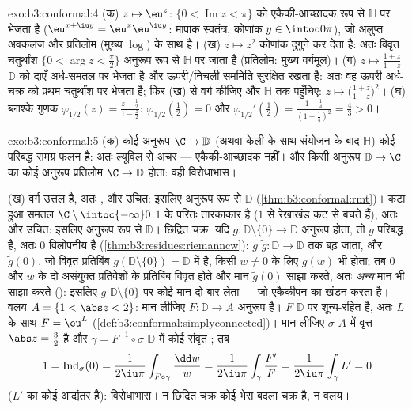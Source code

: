 \begin{solution}{exo:b3:conformal:4}
(क) $z \mapsto \eu^z$: $\{0 < \operatorname{Im}z <
\pi\}$ को एकैकी-आच्छादक रूप से $\mathbb H$ पर भेजता है ($\eu^{x+\iu y} =
\eu^x\eu^{\iu y}$: मापांक
स्वतंत्र, कोणांक $y \in
\intoo0\pi$), जो अलुप्त अवकलज और  प्रतिलोम
(मुख्य $\log$) के साथ  है।
(ख) $z \mapsto z^2$ कोणांक दुगुने कर देता है: अतः विवृत चतुर्थांश $\{0 < \arg z < \frac\pi2\}$ अनुरूप
रूप से $\mathbb
H$ पर जाता है (प्रतिलोम: मुख्य वर्गमूल)।
(ग) $z \mapsto \frac{1 + z}{1 - z}$ $\mathbb D$ को दाएँ अर्ध-समतल पर भेजता है और ऊपरी/निचली सममिति
सुरक्षित रखता है: अतः वह ऊपरी अर्ध-चक्र को प्रथम चतुर्थांश पर भेजता
है; फिर (ख) से वर्ग कीजिए और $\mathbb H$ तक पहुँचिए: $z \mapsto \bigl(\frac{1
+ z}{1 - z}\bigr)^2$।
(घ) ब्लाश्के गुणक $\varphi_{1/2}(z) = \frac{z -
\frac12}{1 - \frac z2}$: $\varphi_{1/2}(\tfrac12) = 0$ और $\varphi_{1/2}'(\tfrac12) = \frac{1 - \frac14}{(1 -
\frac14)^2} = \frac43 > 0$।
\end{solution}

\begin{solution}{exo:b3:conformal:5}
(क) कोई अनुरूप $\C \to \mathbb D$ (अथवा केली के साथ संयोजन के बाद $\mathbb H$) कोई परिबद्ध
समग्र फलन है: अतः ल्यूविल से अचर --- एकैकी-आच्छादक नहीं। और किसी
अनुरूप $\mathbb
D \to \C$ का कोई अनुरूप प्रतिलोम $\C \to \mathbb D$ होता: वही विरोधाभास।

(ख) वर्ग उत्तल है, अतः , और उचित: इसलिए अनुरूप रूप से
$\mathbb D$ (\cref{thm:b3:conformal:rmt})। कटा हुआ समतल $\C\setminus\intoc{-\infty}0$ $1$ के परितः तारकाकार है ($1$ से
रेखाखंड कट से बचते हैं), अतः  और उचित: इसलिए अनुरूप रूप
से $\mathbb D$। छिद्रित चक्र: यदि $g \colon \mathbb D\setminus\{0\} \to \mathbb D$ अनुरूप होता, तो $g$ परिबद्ध है,
अतः $0$ विलोपनीय है (\cref{thm:b3:residues:riemanncw}): $g$ $\tilde g
\colon \mathbb D \to \mathbb D$ तक बढ़ जाता, और $\tilde g(0)$, जो
विवृत प्रतिबिंब $g(\mathbb D\setminus\{0\}) = \mathbb D$ में है, किसी $w \neq 0$ के लिए $g(w)$ भी होता; तब $0$
और $w$ के दो असंयुक्त प्रतिवेशों के प्रतिबिंब विवृत होते और मान
$\tilde g(0)$ साझा करते, अतः \emph{अन्य} मान भी साझा करते ():
इसलिए $g$ $\mathbb D\setminus\{0\}$ पर कोई मान दो बार लेता --- जो एकैकीपन का खंडन करता
है। वलय $A = \{1 < \abs z < 2\}$: मान लीजिए $F \colon \mathbb D
\to A$ अनुरूप है। $F$  $\mathbb D$ पर
शून्य-रहित है, अतः  $L$ के साथ $F = \eu^L$ (\cref{def:b3:conformal:simplyconnected})। मान लीजिए
$\sigma$ $A$ में वृत्त $\abs z = \frac32$ है और $\gamma =
F^{-1}\circ\sigma$ $\mathbb D$ में कोई संवृत ; तब
\[
1 = \operatorname{Ind}_\sigma(0)
= \frac1{2\iu\pi}\int_{F\circ\gamma}\frac{\dd w}{w}
= \frac1{2\iu\pi}\int_\gamma\frac{F'}{F}
= \frac1{2\iu\pi}\int_\gamma L' = 0
\]
($L'$ का कोई आद्यंतर है): विरोधाभास। न छिद्रित चक्र कोई भेस बदला
चक्र है, न वलय।
\end{solution}

